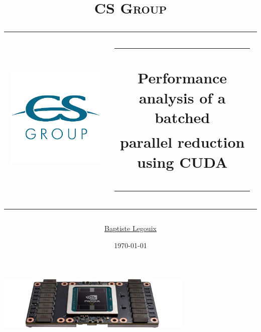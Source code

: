 \documentclass{article}
\begin{document}
\title{\vspace{-70pt}\textsc{CS Group} \\
\vspace{10pt}\hspace*{-25pt}\begin{tabular}{cc}
\multirow{4}{*}{
\begin{minipage}{0.20\textwidth}\vspace{15pt}\includegraphics[scale=0.53]{assets/biglogocs.png}\end{minipage}} & \rule{0.60\linewidth}{0.5pt}\vspace{10pt} \\ & Performance analysis of a batched\\ & parallel reduction using CUDA\\ & \rule{0.60\linewidth}{2pt}
\end{tabular}}
\author{\href{https://drive.google.com/open?id=1ETwTI8ptyoaDpvvjFe6wB5ziKXfQL0BL}{Baptiste Legouix}}
\date{\today}

\clearpage
\maketitle
\thispagestyle{empty}

\vspace{0pt}
\begin{center}
\includegraphics[width=0.7\textwidth]{assets/cover.png}
\end{center}
\vspace{0pt}
\end{document}
